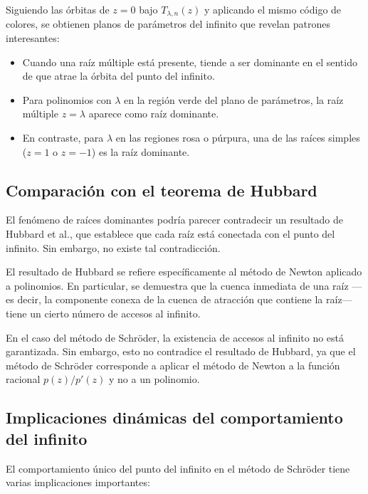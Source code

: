 Siguiendo las órbitas de $z=0$ bajo $T_{\lambda,n}(z)$ y aplicando el mismo código de colores, se obtienen planos de parámetros del infinito que revelan patrones interesantes:

\begin{itemize}
\item Cuando una raíz múltiple está presente, tiende a ser dominante en el sentido de que atrae la órbita del punto del infinito.
\item Para polinomios con $\lambda$ en la región verde del plano de parámetros, la raíz múltiple $z=\lambda$ aparece como raíz dominante.
\item En contraste, para $\lambda$ en las regiones rosa o púrpura, una de las raíces simples ($z=1$ o $z=-1$) es la raíz dominante.
\end{itemize}

\subsection{Comparación con el teorema de Hubbard}

El fenómeno de raíces dominantes podría parecer contradecir un resultado de Hubbard et al., que establece que cada raíz está conectada con el punto del infinito. Sin embargo, no existe tal contradicción.

El resultado de Hubbard se refiere específicamente al método de Newton aplicado a polinomios. En particular, se demuestra que la cuenca inmediata de una raíz ---es decir, la componente conexa de la cuenca de atracción que contiene la raíz--- tiene un cierto número de accesos al infinito.

En el caso del método de Schröder, la existencia de accesos al infinito no está garantizada. Sin embargo, esto no contradice el resultado de Hubbard, ya que el método de Schröder corresponde a aplicar el método de Newton a la función racional $p(z)/p'(z)$ y no a un polinomio.

\subsection{Implicaciones dinámicas del comportamiento del infinito}

El comportamiento único del punto del infinito en el método de Schröder tiene varias implicaciones importantes:

